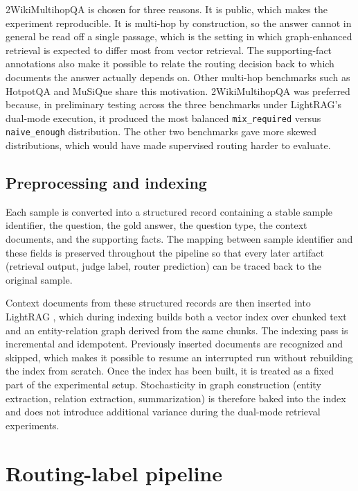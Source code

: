 \documentclass[english, bibtex]{kththesis}               %
\numberwithin{listing}{chapter}
\begin{document}
2WikiMultihopQA is chosen for three reasons. It is public, which makes the experiment reproducible. It is multi-hop by construction, so the answer cannot in general be read off a single passage, which is the setting in which graph-enhanced retrieval is expected to differ most from vector retrieval. The supporting-fact annotations also make it possible to relate the routing decision back to which documents the answer actually depends on. Other multi-hop benchmarks such as HotpotQA and MuSiQue \cite{yang2018hotpotqa,trivedi2022musique} share this motivation. 2WikiMultihopQA was preferred because, in preliminary testing across the three benchmarks under LightRAG's dual-mode execution, it produced the most balanced \texttt{mix\_required} versus \texttt{naive\_enough} distribution. The other two benchmarks gave more skewed distributions, which would have made supervised routing harder to evaluate.

\subsection{Preprocessing and indexing}
\label{sec:methodPreprocessing}

Each sample is converted into a structured record containing a stable sample identifier, the question, the gold answer, the question type, the context documents, and the supporting facts. The mapping between sample identifier and these fields is preserved throughout the pipeline so that every later artifact (retrieval output, judge label, router prediction) can be traced back to the original sample.

Context documents from these structured records are then inserted into LightRAG \cite{lightrag2024}, which during indexing builds both a vector index over chunked text and an entity-relation graph derived from the same chunks. The indexing pass is incremental and idempotent. Previously inserted documents are recognized and skipped, which makes it possible to resume an interrupted run without rebuilding the index from scratch. Once the index has been built, it is treated as a fixed part of the experimental setup. Stochasticity in graph construction (entity extraction, relation extraction, summarization) is therefore baked into the index and does not introduce additional variance during the dual-mode retrieval experiments.

\section{Routing-label pipeline}
\label{sec:methodPipeline}
\end{document}
